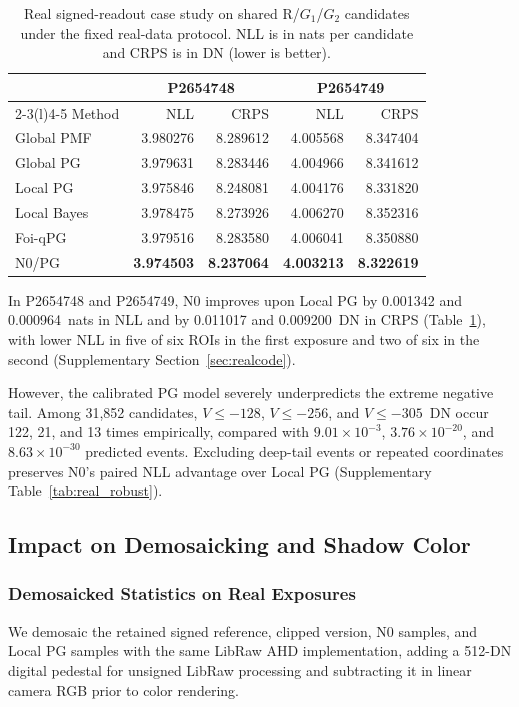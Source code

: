 \documentclass[10pt,twocolumn,journal]{IEEEtran}
\begin{document}
\begin{table}[t]
\centering
\caption{Real signed-readout case study on shared R/$G_1$/$G_2$ candidates under the fixed real-data protocol. NLL is in nats per candidate and CRPS is in DN (lower is better).}
\label{tab:real}
\footnotesize
\begin{tabular}{@{}lrrrr@{}}
\toprule
& \multicolumn{2}{c}{P2654748} & \multicolumn{2}{c}{P2654749}\\
\cmidrule(lr){2-3}\cmidrule(l){4-5}
Method & NLL & CRPS & NLL & CRPS\\
\midrule
Global PMF & 3.980276 & 8.289612 & 4.005568 & 8.347404\\
Global PG & 3.979631 & 8.283446 & 4.004966 & 8.341612\\
Local PG & 3.975846 & 8.248081 & 4.004176 & 8.331820\\
Local Bayes & 3.978475 & 8.273926 & 4.006270 & 8.352316\\
Foi-qPG & 3.979516 & 8.283580 & 4.006041 & 8.350880\\
N0/PG & \textbf{3.974503} & \textbf{8.237064} & \textbf{4.003213} & \textbf{8.322619}\\
\bottomrule
\end{tabular}
\end{table}

In P2654748 and P2654749, N0 improves upon Local PG by 0.001342 and 0.000964~nats in NLL and by 0.011017 and 0.009200~DN in CRPS (Table~\ref{tab:real}), with lower NLL in five of six ROIs in the first exposure and two of six in the second (Supplementary Section~\ref{sec:realcode}).

However, the calibrated PG model severely underpredicts the extreme negative tail. Among 31,852 candidates, $V\leq-128$, $V\leq-256$, and $V\leq-305$~DN occur 122, 21, and 13 times empirically, compared with $9.01\times10^{-3}$, $3.76\times10^{-20}$, and $8.63\times10^{-30}$ predicted events. Excluding deep-tail events or repeated coordinates preserves N0's paired NLL advantage over Local PG (Supplementary Table~\ref{tab:real_robust}).

\subsection{Impact on Demosaicking and Shadow Color}\label{sec:downstream}
\subsubsection{Demosaicked Statistics on Real Exposures}
We demosaic the retained signed reference, clipped version, N0 samples, and Local PG samples with the same LibRaw AHD implementation, adding a 512-DN digital pedestal for unsigned LibRaw processing and subtracting it in linear camera RGB prior to color rendering.
\end{document}
